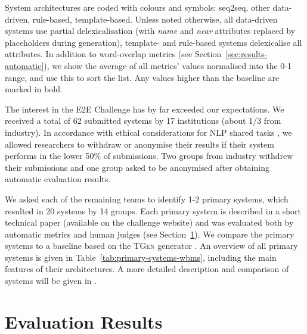 \documentclass[11pt,a4paper]{article}
\newcommand\tgen{\textsc{TGen}\xspace}
\newcommand{\symbseq}{}
\newcommand{\symbdd}{}
\newcommand{\symbrule}{}
\newcommand{\symbtempl}{}
\begin{document}
\begin{table*}[t]
\medskip\small
System architectures are coded with colours and symbols: \textcolor{seqtoseq}{\symbseq seq2seq}, \textcolor{datadriven}{\symbdd other data-driven}, \textcolor{rules}{\symbrule rule-based}, \textcolor{templates}{\symbtempl template-based}.
Unless noted otherwise, all data-driven systems use partial delexicalisation (with \emph{name} and \emph{near} attributes replaced by placeholders during generation), template- and rule-based systems delexicalise all attributes.
In addition to word-overlap metrics (see Section~\ref{sec:results-automatic}), we show the average of all metrics' values normalised into the 0-1 range, and use this to sort the list. Any values higher than the baseline are marked in bold.
\end{table*}

The interest in the E2E Challenge has by far exceeded our expectations. We received a total of 62 submitted systems by 17 institutions (about 1/3 from industry).
In accordance with ethical considerations for NLP shared tasks \cite{ethicalSharedTasks}, we allowed researchers to withdraw or anonymise their results if their system performs in the lower 50\% of submissions.
Two groups from industry withdrew their submissions and one group asked to be anonymised
after obtaining automatic evaluation results. 


We asked each of the remaining teams to identify 1-2 primary systems, which resulted in 20 systems by 14 groups. 
Each primary system is described in a short technical paper (available on the challenge website) and was
evaluated both by automatic metrics and human judges (see Section~\ref{sec:results}).
We compare the primary systems to a baseline based on the \tgen generator \cite{Dusek:ACL16}.
An overview of all primary systems is given in Table~\ref{tab:primary-systems-wbms}, including the main features of their architectures.
A more detailed description and comparison of systems will be given in \cite{dusek2018e2e}.


\section{Evaluation Results}\label{sec:results}
\end{document}

